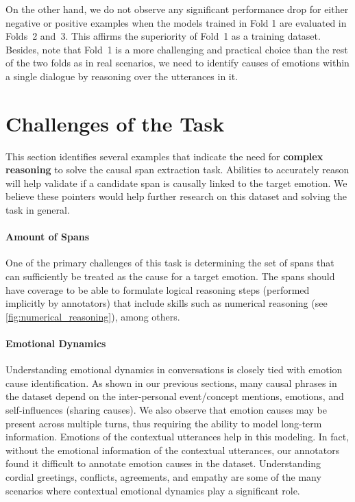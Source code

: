 \documentclass[smallextended]{svjour3}
\newcommand\0{\hphantom{0}}
\begin{document}
On the other hand, we do not observe any significant performance drop for either negative or positive examples when the models trained in Fold 1 are evaluated in Folds~2 and~3. This affirms the superiority of Fold~1 as a training dataset. Besides, note that Fold~1 is a more challenging and practical choice than the rest of the two folds as in real scenarios, we need to identify causes of emotions within a single dialogue by reasoning over the utterances in it.

\section{Challenges of the Task} 
\label{sec:challengesx}

This section identifies several examples that indicate the need for \textbf{complex reasoning} to solve the causal span extraction task. Abilities to accurately reason will help validate if a candidate span is causally linked to the target emotion. We believe these pointers would help further research on this dataset and solving the task in general.

\paragraph{Amount of Spans} 
One of the primary challenges of this task is determining the set of spans that can sufficiently be treated as the cause for a target emotion. The spans should have coverage to be able to formulate logical reasoning steps (performed implicitly by annotators) that include skills such as numerical reasoning (see \cref{fig:numerical_reasoning}), among others.

\paragraph{Emotional Dynamics} Understanding emotional dynamics in conversations is closely tied with emotion cause identification. As shown in our previous sections, many causal phrases in the dataset depend on the inter-personal event/concept mentions, emotions, and self-influences (sharing causes). We also observe that emotion causes may be present across multiple turns, thus requiring the ability to model long-term information. Emotions of the contextual utterances help in this modeling. In fact, without the emotional information of the contextual utterances, our annotators found it difficult to annotate emotion causes in the dataset. Understanding cordial greetings, conflicts, agreements, and empathy are some of the many scenarios where contextual emotional dynamics play a significant role. 
\end{document}
